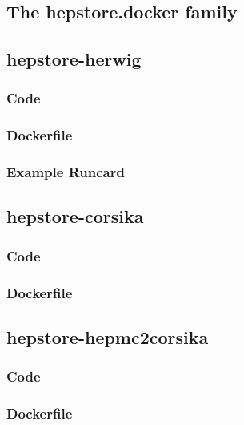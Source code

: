 \documentclass[aps,prd,11pt,tightenlines,superscriptaddress,nofootinbib,preprintnumbers,notitlepage]{revtex4-1}
\begin{document}
\begin{appendix}

  \section{The hepstore.docker family}
  \label{app:docker}

  \subsection{hepstore-herwig}

  \subsubsection{Code}
  \begin{changemargin}{1.5cm}{1.5cm} 
    
  \end{changemargin}

  \subsubsection{Dockerfile}
  \begin{changemargin}{1.5cm}{1.5cm} 
    
  \end{changemargin}

  \subsubsection{Example Runcard}
  \begin{changemargin}{1.5cm}{1.5cm} 
    
  \end{changemargin}
  
  \subsection{hepstore-corsika}

  \subsubsection{Code}

  \subsubsection{Dockerfile}
  
  \subsection{hepstore-hepmc2corsika}

  \subsubsection{Code}

  \subsubsection{Dockerfile}

\end{appendix}
\end{document}
